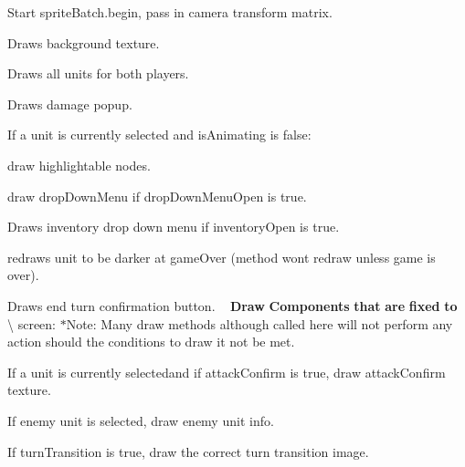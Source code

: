 \begin{DoxyItemize}
\item Start sprite\+Batch.\+begin, pass in camera transform matrix.
\item Draws background texture. ~\newline

\item Draws all units for both players. ~\newline

\item Draws damage popup. ~\newline

\item If a unit is currently selected and is\+Animating is false\+: ~\newline

\begin{DoxyEnumerate}
\item draw highlightable nodes. ~\newline

\item draw drop\+Down\+Menu if drop\+Down\+Menu\+Open is true. ~\newline

\item Draws inventory drop down menu if inventory\+Open is true. ~\newline

\end{DoxyEnumerate}
\item redraws unit to be darker at game\+Over (method won\textquotesingle{}t redraw unless game is over). ~\newline

\item Draws end turn confirmation button. ~\newline
 {\bfseries Draw} {\bfseries Components} {\bfseries that} {\bfseries are} {\bfseries fixed} {\bfseries to} \textbackslash{} screen\+: $\ast$\+Note\+: Many draw methods although called here will not perform any action should the conditions to draw it not be met.
\item If a unit is currently selectedand if attack\+Confirm is true, draw attack\+Confirm texture. ~\newline

\item If enemy unit is selected, draw enemy unit info. ~\newline

\item If turn\+Transition is true, draw the correct turn transition image. ~\newline


\end{DoxyItemize}
